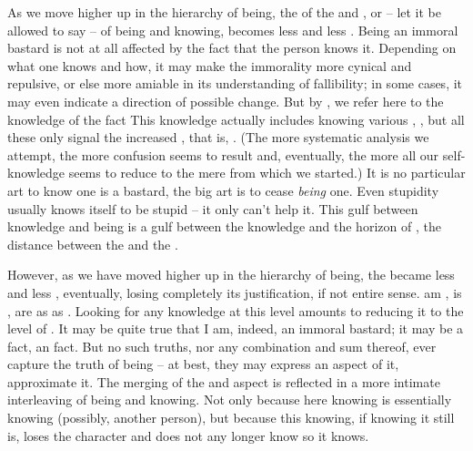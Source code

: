 \mine %
As we move higher up in the hierarchy of being, the  of the
 and , or -- let it be allowed to say -- of being
and knowing, becomes less and less .  Being an immoral
bastard is not at all affected by the fact that the person  knows
it. Depending 
on what one knows and how, it may make the immorality more cynical and
repulsive, or else more amiable in its understanding of fallibility; in some
cases, it may even indicate a direction of possible change.  But by , we refer here to the  knowledge of
the fact   This knowledge actually includes knowing various
, ,  but all these only signal the 
increased , that is, . (The more systematic
analysis we attempt, the more confusion seems to result and, eventually, the
more all our self-knowledge seems to reduce to the mere  from which we
started.)  It is no particular art to know  one is a bastard, the big
art is to cease {\em being} one. Even stupidity usually knows itself to be
stupid -- it only can't help it. This gulf between knowledge and being is a gulf
between the  knowledge and the horizon of , the
distance between the  and the .

However, as we have moved higher up in the hierarchy of being, the
 became less and less , eventually, losing
completely its justification, if not entire sense.   am ,
 is ,  are as  as
.  Looking for any  knowledge at this level amounts
to reducing it to the level of .  It may be quite true that I am,
indeed, an immoral bastard; it may be a fact, an  fact. But no
such  truths, nor any combination and sum thereof, ever capture the
truth of  being -- at best, they may express an aspect of it, approximate
it. The merging of the  and  aspect is reflected
in a more intimate interleaving of being and knowing. Not only because here
knowing is essentially knowing  (possibly, another person), but
because this knowing, if knowing it still is, loses the  character
and does not any longer know so   it knows.

